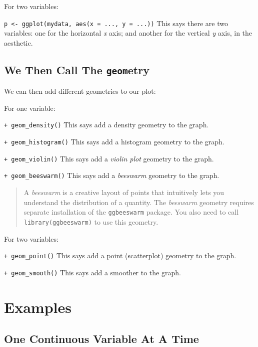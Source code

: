 \documentclass[12pt,]{article}
\begin{document}
For two variables:

\texttt{p\ \textless{}-\ ggplot(mydata,\ aes(x\ =\ ...,\ y\ =\ ...))}
This says there are two variables: one for the horizontal \emph{x} axis;
and another for the vertical \emph{y} axis, in the aesthetic.

\hypertarget{we-then-call-the-geometry}{%
\subsection{\texorpdfstring{We Then Call The
\texttt{geom}etry}{We Then Call The geometry}}\label{we-then-call-the-geometry}}

We can then add different geometries to our plot:

For one variable:

\texttt{+\ geom\_density()} This says add a density geometry to the
graph.

\texttt{+\ geom\_histogram()} This says add a histogram geometry to the
graph.

\texttt{+\ geom\_violin()} This says add a \emph{violin plot} geometry
to the graph.

\texttt{+\ geom\_beeswarm()} This says add a \emph{beeswarm} geometry to
the graph.

\begin{quote}
A \emph{beeswarm} is a creative layout of points that intuitively lets
you understand the distribution of a quantity. The \emph{beeswarm}
geometry requires separate installation of the \texttt{ggbeeswarm}
package. You also need to call \texttt{library(ggbeeswarm)} to use this
geometry.
\end{quote}

For two variables:

\texttt{+\ geom\_point()} This says add a point (scatterplot) geometry
to the graph.

\texttt{+\ geom\_smooth()} This says add a smoother to the graph.

\hypertarget{examples}{%
\section{Examples}\label{examples}}

\hypertarget{one-continuous-variable-at-a-time}{%
\subsection{One Continuous Variable At A
Time}\label{one-continuous-variable-at-a-time}}
\end{document}
